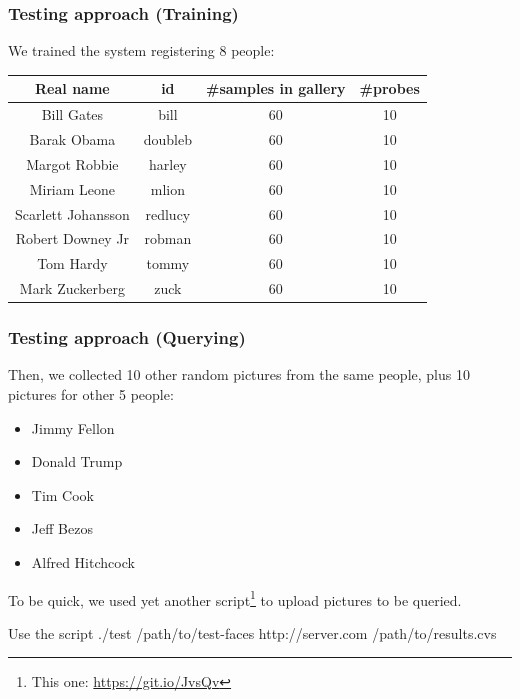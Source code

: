 \begin{frame} \frametitle{Testing approach (Training)}

	We trained the system registering 8 people:
	
	\begin{center}
 		\begin{tabular}{||c | c | c | c||} 
			 \hline
			 	\textbf{Real name} & 
			 	\textbf{id} & 
			 	\textbf{\#samples in gallery} & 
			 	\textbf{\#probes} 
			 \\ [0.5ex] 
			 \hline\hline
			 	Bill Gates & 
			 	bill & 
			 	60 & 
			 	10 
			 \\ 
			 \hline
			 	Barak Obama & 
			 	doubleb & 
			 	60 & 
			 	10 
			 \\
			 \hline
			 	Margot Robbie & 
				harley & 
			 	60 & 
			 	10 
			 \\
			 \hline
			 	Miriam Leone & 
			 	mlion & 
			 	60 & 
			 	10 
			 \\
			 \hline
			 	Scarlett Johansson & 
			 	redlucy & 
			 	60 & 
			 	10 
			\\
			 \hline
			 	Robert Downey Jr & 
				robman & 
			 	60 & 
			 	10 
			 \\
			 \hline
			 	Tom Hardy & 
			 	tommy & 
			 	60 & 
			 	10
			\\
			 \hline
			 	Mark Zuckerberg & 
			 	zuck & 
			 	60 & 
			 	10
			\\ [1ex] 
 			\hline
		\end{tabular}
	\end{center}	

\end{frame}

\begin{frame} \frametitle{Testing approach (Querying)}
	
	Then, we collected 10 other random pictures from the same 
	people, plus 10 pictures for other 5 people:
	
	\begin{itemize}
		\item Jimmy Fellon
		\item Donald Trump
		\item Tim Cook
		\item Jeff Bezos
		\item Alfred Hitchcock
	\end{itemize}
	
	To be quick, we used yet another script\footnote{This one: {\color{red} \url{https://git.io/JvsQv}}} to upload
	pictures to be queried. 
	
	\begin{block}{Use the script}
		./test /path/to/test-faces http://server.com /path/to/results.cvs
	\end{block}

\end{frame}

